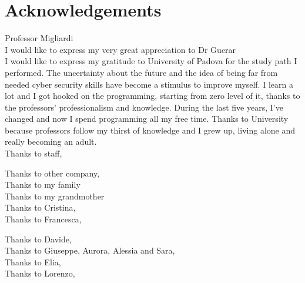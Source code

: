 \chapter*{Acknowledgements}
Professor Migliardi\\

I would like to express my very great appreciation to Dr Guerar\\

I would like to express my gratitude to University of Padova for the study path I performed. The uncertainty about the future and the idea of being far from needed cyber security skills have become a stimulus to improve myself. I learn a lot and I got hooked on the programming, starting from zero level of it, thanks to the professors' professionalism and knowledge. During the last five years, I've changed and now I spend programming all my free time. Thanks to University because professors follow my thirst of knowledge and I grew up, living alone and really becoming an adult.\\

Thanks to staff,

Thanks to other company,\\

Thanks to my family\\

Thanks to my grandmother\\

Thanks to Cristina,\\

Thanks to Francesca,

Thanks to Davide,\\

Thanks to Giuseppe, Aurora, Alessia and Sara,\\

Thanks to Elia,\\

Thanks to Lorenzo,\\